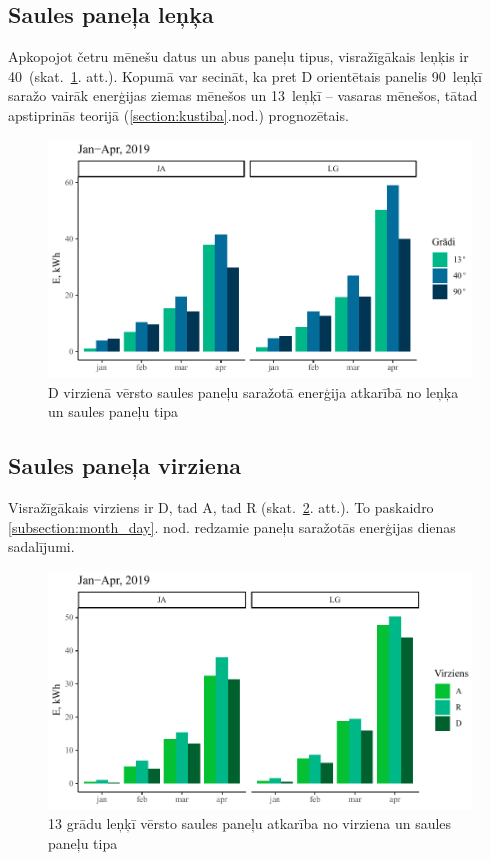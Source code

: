 \subsection{Saules paneļa leņķa}\label{subsection:degree}
Apkopojot četru mēnešu datus un abus paneļu tipus, visražīgākais leņķis ir 40\textdegree ~(skat.~\ref{fig:lg_ja_deg}. att.).
Kopumā var secināt, ka pret D orientētais panelis 90\textdegree ~leņķī saražo vairāk enerģijas ziemas mēnešos un 13\textdegree ~leņķī -- vasaras mēnešos, tātad apstiprinās teorijā (\ref{section:kustiba}.nod.) prognozētais.
\begin{figure}[h!]
    \centering
    \includegraphics[width=\linewidth]{figures/results/all_degType.pdf}
    \caption{D virzienā vērsto saules paneļu saražotā enerģija atkarībā no leņķa un saules paneļu tipa} \label{fig:lg_ja_deg}
\end{figure}


\subsection{Saules paneļa virziena}\label{subsection:dir}
Visražīgākais virziens ir D, tad A, tad R (skat.~\ref{fig:lg_ja_dir}. att.). To paskaidro \ref{subsection:month_day}. nod. redzamie paneļu saražotās enerģijas dienas sadalījumi.
\begin{figure}[h!]
    \centering
    \includegraphics[width=\linewidth]{figures/results/all_dirType.pdf}
    \caption{13 grādu leņķī vērsto saules paneļu atkarība no virziena un saules paneļu tipa}
    \label{fig:lg_ja_dir}
\end{figure}


